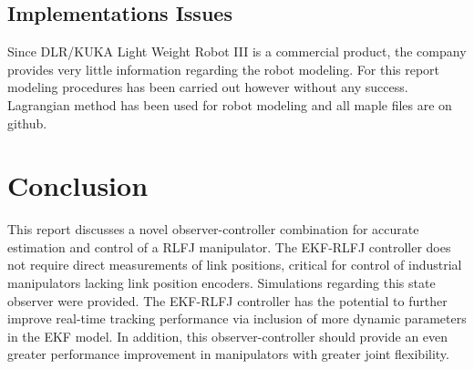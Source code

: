 \documentclass[conference]{IEEEtran}
\begin{document}
\subsection{Implementations Issues}
Since DLR/KUKA Light Weight Robot III is a commercial product, the company
provides very little information regarding the robot modeling. For this report
modeling procedures has been carried out however without any success. Lagrangian
method has been used for robot modeling and all maple files are on github. 



\section{Conclusion} 
This report discusses a novel observer-controller combination for accurate
estimation and control of a RLFJ manipulator. The EKF-RLFJ controller does not require direct measurements of
link positions, critical for control of industrial manipulators lacking link
position encoders. Simulations regarding this state observer were provided. The
EKF-RLFJ controller has the potential to further improve real-time tracking
performance via inclusion of more dynamic parameters in the
EKF model. In addition, this observer-controller should provide
an even greater performance improvement in manipulators with
greater joint flexibility.






\end{document}
